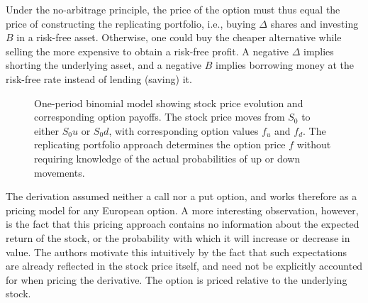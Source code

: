 \documentclass[english,12pt,a4paper,pdftex,sci,utf8]{aaltothesis}
\begin{document}
Under the no-arbitrage principle, the price of the option must thus equal the price of constructing the replicating portfolio, i.e., buying $\Delta$ shares and investing $B$ in a risk-free asset. Otherwise, one could buy the cheaper alternative while selling the more expensive to obtain a risk-free profit. A negative $\Delta$ implies shorting the underlying asset, and a negative $B$ implies borrowing money at the risk-free rate instead of lending (saving) it.
\begin{figure}[htbp]
    \centering
    \caption{One-period binomial model showing stock price evolution and corresponding option payoffs. The stock price moves from $S_0$ to either $S_0u$ or $S_0d$, with corresponding option values $f_u$ and $f_d$. The replicating portfolio approach determines the option price $f$ without requiring knowledge of the actual probabilities of up or down movements.}
    \label{fig:oneperiodbinom}
\end{figure}

The derivation assumed neither a call nor a put option, and works therefore as a pricing model for any European option. A more interesting observation, however, is the fact that this pricing approach contains no information about the expected return of the stock, or the probability with which it will increase or decrease in value. The authors motivate this intuitively by the fact that such expectations are already reflected in the stock price itself, and need not be explicitly accounted for when pricing the derivative. The option is priced relative to the underlying stock.
\end{document}
